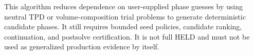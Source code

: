\documentclass[12pt, letterpaper]{article}
\begin{document}

This algorithm reduces dependence on user-supplied phase guesses by using
neutral TPD or volume-composition trial problems to generate deterministic
candidate phases. It still requires bounded seed policies, candidate ranking,
continuation, and postsolve certification. It is not full HELD and must not be
used as generalized production evidence by itself.

\end{document}
